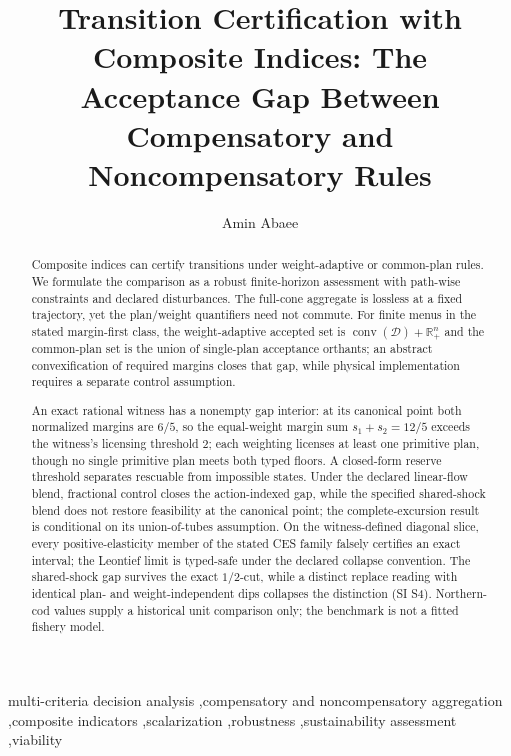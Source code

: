 \documentclass[preprint,11pt,authoryear]{elsarticle}
\theoremstyle{definition}
\theoremstyle{remark}
\newcommand{\conv}{\operatorname{conv}}
\newcommand{\Rp}{\mathbb{R}^n_+}
\begin{document}
\begin{frontmatter}

\title{Transition Certification with Composite Indices: The Acceptance Gap Between Compensatory and Noncompensatory Rules}

\author[1]{Amin Abaee}

\begin{abstract}
Composite indices can certify transitions under weight-adaptive or common-plan rules. We formulate the comparison as a robust finite-horizon assessment with path-wise constraints and declared disturbances. The full-cone aggregate is lossless at a fixed trajectory, yet the plan/weight quantifiers need not commute. For finite menus in the stated margin-first class, the weight-adaptive accepted set is $\conv(\mathcal D)+\Rp$ and the common-plan set is the union of single-plan acceptance orthants; an abstract convexification of required margins closes that gap, while physical implementation requires a separate control assumption.

An exact rational witness has a nonempty gap interior: at its canonical point both normalized margins are $6/5$, so the equal-weight margin sum $s_1+s_2=12/5$ exceeds the witness's licensing threshold $2$; each weighting licenses at least one primitive plan, though no single primitive plan meets both typed floors. A closed-form reserve threshold separates rescuable from impossible states. Under the declared linear-flow blend, fractional control closes the action-indexed gap, while the specified shared-shock blend does not restore feasibility at the canonical point; the complete-excursion result is conditional on its union-of-tubes assumption. On the witness-defined diagonal slice, every positive-elasticity member of the stated CES family falsely certifies an exact interval; the Leontief limit is typed-safe under the declared collapse convention. The shared-shock gap survives the exact $1/2$-cut, while a distinct replace reading with identical plan- and weight-independent dips collapses the distinction (SI S4). Northern-cod values supply a historical unit comparison only; the benchmark is not a fitted fishery model.
\end{abstract}

\begin{keyword}
multi-criteria decision analysis \sep compensatory and noncompensatory aggregation \sep composite indicators \sep scalarization \sep robustness \sep sustainability assessment \sep viability
\end{keyword}

\end{frontmatter}
\end{document}
